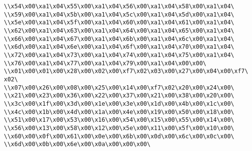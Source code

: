 \verb|\\x54\x00\xa1\x04\x55\x00\xa1\x04\x56\x00\xa1\x04\x58\x00\xa1\x04\|\newline
\verb|\\x59\x00\xa1\x04\x5b\x00\xa1\x04\x5c\x00\xa1\x04\x5d\x00\xa1\x04\|\newline
\verb|\\x5e\x00\xa1\x04\x5f\x00\xa1\x04\x60\x00\xa1\x04\x61\x00\xa1\x04\|\newline
\verb|\\x62\x00\xa1\x04\x63\x00\xa1\x04\x64\x00\xa1\x04\x65\x00\xa1\x04\|\newline
\verb|\\x66\x00\xa1\x04\x67\x00\xa1\x04\x6b\x00\xa1\x04\x6c\x00\xa1\x04\|\newline
\verb|\\x6d\x00\xa1\x04\x6e\x00\xa1\x04\x6f\x00\xa1\x04\x70\x00\xa1\x04\|\newline
\verb|\\x72\x00\xa1\x04\x73\x00\xa1\x04\x74\x00\xa1\x04\x75\x00\xa1\x04\|\newline
\verb|\\x76\x00\xa1\x04\x77\x00\xa1\x04\x79\x00\xa1\x04\x00\x00\|\newline
\verb|\\x01\x00\x01\x00\x28\x00\x02\x00\xf7\x02\x03\x00\x27\x00\x04\x00\xf7\x02\|\newline
\verb|\\x07\x00\x26\x00\x08\x00\x25\x00\x14\x00\xf7\x02\x20\x00\x24\x00\|\newline
\verb|\\x21\x00\x23\x00\x36\x00\x22\x00\x37\x00\x21\x00\x38\x00\x20\x00\|\newline
\verb|\\x3c\x00\x1f\x00\x3d\x00\x1e\x00\x3e\x00\x1d\x00\x4b\x00\x1c\x00\|\newline
\verb|\\x4c\x00\x1b\x00\x4d\x00\x1a\x00\x4e\x00\x19\x00\x50\x00\x18\x00\|\newline
\verb|\\x51\x00\x17\x00\x53\x00\x16\x00\x54\x00\x15\x00\x55\x00\x14\x00\|\newline
\verb|\\x56\x00\x13\x00\x58\x00\x12\x00\x5e\x00\x11\x00\x5f\x00\x10\x00\|\newline
\verb|\\x60\x00\x0f\x00\x61\x00\x0e\x00\x6b\x00\x0d\x00\x6c\x00\x0c\x00\|\newline
\verb|\\x6d\x00\x0b\x00\x6e\x00\x0a\x00\x00\x00\|\newline
